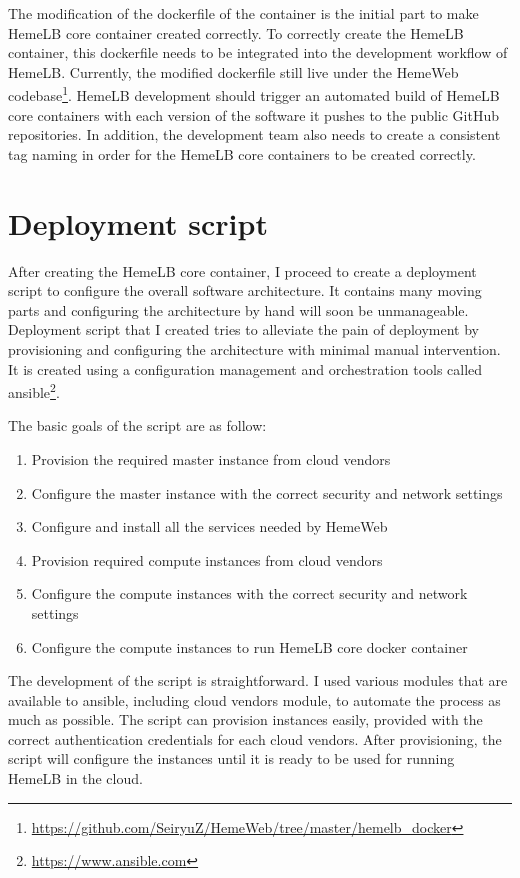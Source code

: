 The modification of the dockerfile of the container is the initial part to make HemeLB core container created correctly. To correctly create the HemeLB container, this dockerfile needs to be integrated into the development workflow of HemeLB. Currently, the modified dockerfile still live under the HemeWeb codebase\footnote{\url{https://github.com/SeiryuZ/HemeWeb/tree/master/hemelb_docker}}. HemeLB development should trigger an automated build of HemeLB core containers with each version of the software it pushes to the public GitHub repositories. In addition, the development team also needs to create a consistent tag naming in order for the HemeLB core containers to be created correctly.


\section{Deployment script}

After creating the HemeLB core container, I proceed to create a deployment script to configure the overall software architecture. It contains many moving parts and configuring the architecture by hand will soon be unmanageable. Deployment script that I created tries to alleviate the pain of deployment by provisioning and configuring the architecture with minimal manual intervention. It is created using a configuration management and orchestration tools called ansible\footnote{\url{https://www.ansible.com}}.

The basic goals of the script are as follow:
\begin{enumerate}
\item Provision the required master instance from cloud vendors
\item Configure the master instance with the correct security and network settings
\item Configure and install all the services needed by HemeWeb
\item Provision required compute instances from cloud vendors
\item Configure the compute instances with the correct security and network settings
\item Configure the compute instances to run HemeLB core docker container
\end{enumerate}

The development of the script is straightforward. I used various modules that are available to ansible, including cloud vendors module, to automate the process as much as possible. The script can provision instances easily, provided with the correct authentication credentials for each cloud vendors. After provisioning, the script will configure the instances until it is ready to be used for running HemeLB in the cloud.

